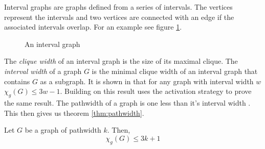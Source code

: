 Interval graphs are graphs defined from a series of intervals. The vertices represent the intervals and two vertices are connected with an edge if the associated intervals overlap. For an example see figure \ref{fig:intvGraph}.
%
\begin{figure}[h]
    \centering
    \caption{An interval graph}
    \label{fig:intvGraph}
\end{figure}
%
The \textit{clique width} of an interval graph is the size of its maximal clique. The \textit{interval width} of a graph $G$ is the minimal clique width of an interval graph that contains $G$ as a subgraph. It is shown in \cite{faKeKiTr1993} that for any graph with interval width $w$ $\chi_g(G)\leq 3w -1$. Building on this result \cite{KIERSTEAD2000} uses the activation strategy to prove the same result. The pathwidth of a graph is one less than it's interval width \cite{Bodlaender1998}. This then gives us theorem \ref{thm:pathwidth}. 

\begin{theorem}\label{thm:pathwidth}
    Let $G$ be a graph of pathwidth $k$. Then, 
    \[\chi_g(G) \leq 3k + 1\]    
\end{theorem}

